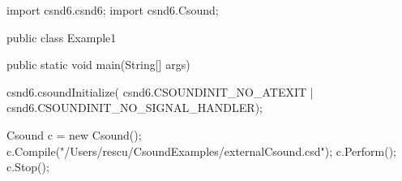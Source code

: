 import csnd6.csnd6;
import csnd6.Csound;

public class Example1 {

    public static void main(String[] args) {
        csnd6.csoundInitialize(
                csnd6.CSOUNDINIT_NO_ATEXIT | csnd6.CSOUNDINIT_NO_SIGNAL_HANDLER);

        Csound c = new Csound();
        c.Compile("/Users/rescu/CsoundExamples/externalCsound.csd");
        c.Perform();               
        c.Stop();                                                               
    }
}